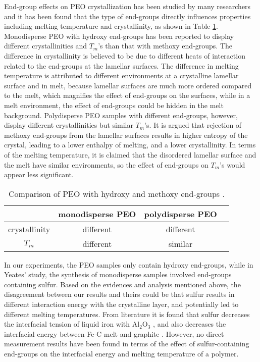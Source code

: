 End-group effects on PEO crystallization has been studied by many researchers and it has been found that the type of end-groups directly influences properties including melting temperature and crystallinity, as shown in Table \ref{tab:end-group effects}. Monodisperse PEO with hydroxy end-groups has been reported to display different crystallinities and $T_{m}$'s than that with methoxy end-groups. The difference in crystallinity is believed to be due to different heats of interaction related to the end-groups at the lamellar surfaces. The difference in melting temperature is attributed to different environments at a crystalline lamellar surface and in melt, because lamellar surfaces are much more ordered compared to the melt, which magnifies the effect of end-groups on the surfaces, while in a melt environment, the effect of end-groups could be hidden in the melt background. Polydisperse PEO samples with different end-groups, however, display different crystallinities but similar $T_{m}$'s. It is argued that rejection of methoxy end-groups from the lamellar surfaces results in higher entropy of the crystal, leading to a lower enthalpy of melting, and a lower crystallinity. In terms of the melting temperature, it is claimed that the disordered lamellar surface and the melt have similar environments, so the effect of end-groups on $T_{m}$'s would appear less significant.
\begin{table}[H]
\centering
	\begin{tabular}{ |c|c|c|c| } 
		\hline
		 & monodisperse PEO & polydisperse PEO \\
		\hline
		\hline
		crystallinity & different & different \\ 
		\hline
		$T_{m}$ & different & similar \\ 
		\hline
	\end{tabular}
	\caption{\label{tab:end-group effects}Comparison of PEO with hydroxy and methoxy end-groups \cite{Marshall1981}.}
\end{table}
In our experiments, the PEO samples only contain hydroxy end-groups, while in Yeates' study, the synthesis of monodisperse samples involved end-groups containing sulfur. Based on the evidences and analysis mentioned above, the  disagreement between our results and theirs could be that sulfur results in different interaction energy with the crystalline layer, and potentially led to different melting temperatures. From literature it is found that sulfur decreases the interfacial tension of liquid iron with $\text{Al}_{\text{2}}\text{O}_{\text{3}}$ \cite{Halden1955}, and also decreases the interfacial energy between Fe-C melt and graphite \cite{Jung2005}. However, no direct measurement results have been found in terms of the effect of sulfur-containing end-groups on the interfacial energy and melting temperature of a polymer.


